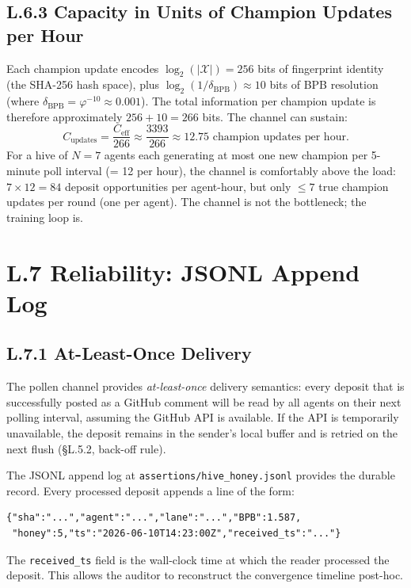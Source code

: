 \subsection*{L.6.3 \quad Capacity in Units of Champion Updates per Hour}

Each champion update encodes $\log_{2}(|\mathcal{X}|) = 256$ bits of
fingerprint identity (the SHA-256 hash space), plus
$\log_{2}(1/\delta_{\text{BPB}}) \approx 10$ bits of BPB resolution
(where $\delta_{\text{BPB}} = \varphi^{-10} \approx 0.001$).  The
total information per champion update is therefore approximately
$256 + 10 = 266$ bits.  The channel can sustain:
\begin{equation}
  C_{\text{updates}} = \frac{C_{\text{eff}}}{266} \approx
  \frac{3393}{266} \approx 12.75 \text{ champion updates per hour.}
  \label{eq:cupdates}
\end{equation}
For a hive of $N = 7$ agents each generating at most one new champion
per 5-minute poll interval (= 12 per hour), the channel is
comfortably above the load:  $7 \times 12 = 84$ deposit
opportunities per agent-hour, but only $\leq 7$ true champion updates
per round (one per agent).  The channel is not the bottleneck; the
training loop is.

\section*{L.7 \quad Reliability: JSONL Append Log}
\label{sec:appl-reliability}

\subsection*{L.7.1 \quad At-Least-Once Delivery}

The pollen channel provides \emph{at-least-once} delivery semantics:
every deposit that is successfully posted as a GitHub comment will be
read by all agents on their next polling interval, assuming the
GitHub API is available.  If the API is temporarily unavailable, the
deposit remains in the sender's local buffer and is retried on the
next flush (§L.5.2, back-off rule).

The JSONL append log at \texttt{assertions/hive\_honey.jsonl}
provides the durable record.  Every processed deposit appends a line
of the form:
\begin{verbatim}
{"sha":"...","agent":"...","lane":"...","BPB":1.587,
 "honey":5,"ts":"2026-06-10T14:23:00Z","received_ts":"..."}
\end{verbatim}
The \texttt{received\_ts} field is the wall-clock time at which the
reader processed the deposit.  This allows the auditor to reconstruct
the convergence timeline post-hoc.

